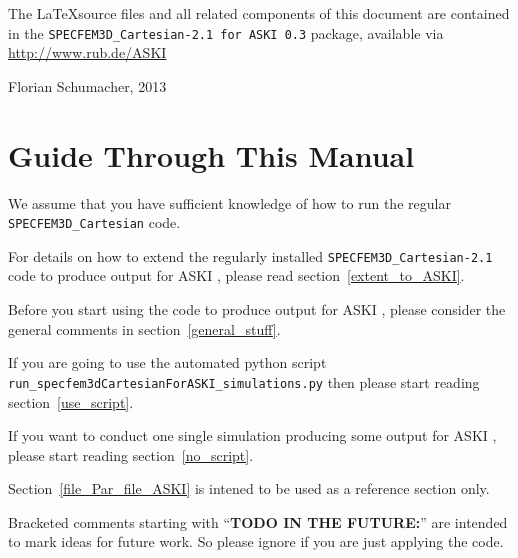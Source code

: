 \documentclass[12pt,a4paper]{article}
\newcommand{\lcode}[1]{\nolinkurl{#1}}
\newcommand{\ASKI}{ {\ttfamily ASKI} }
\begin{document}
The \LaTeX source files and all related components of this document are contained in the 
\lcode{SPECFEM3D_Cartesian-2.1 for ASKI 0.3} package, available via \url{http://www.rub.de/ASKI}
\begin{flushright}
Florian Schumacher, 2013
\end{flushright}
%
\section*{Guide Through This Manual}
%
We assume that you have sufficient knowledge of how to run the regular \lcode{SPECFEM3D_Cartesian} code.

For details on how to extend the regularly installed \lcode{SPECFEM3D_Cartesian-2.1} code to produce
output for \ASKI, please read section~\ref{extent_to_ASKI}.

Before you start using the code to produce output for \ASKI, please consider the general
comments in section~\ref{general_stuff}.

If you are going to use the automated python script \\ \lcode{run_specfem3dCartesianForASKI_simulations.py} 
then please start reading section~\ref{use_script}. 

If you want to conduct one single simulation producing some output for \ASKI, please start 
reading section~\ref{no_script}.

Section~\ref{file_Par_file_ASKI} is intened to be used as a reference section only.

Bracketed comments starting with ``{\bf TODO IN THE FUTURE:}'' are intended to mark ideas for future work. 
So please ignore if you are just applying the code.
%
\newpage
\tableofcontents
\newpage
%
\end{document}
